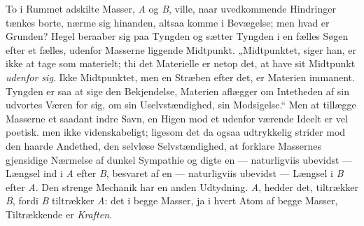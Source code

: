 \documentclass[12pt,a4paper]{book}
\begin{document}
To i Rummet adskilte Masser, \textit{A} og \textit{B}, ville, naar
uvedkommende Hindringer tænkes borte, nærme sig hinanden, altsaa komme
i Bevægelse; men hvad er Grunden? Hegel beraaber sig paa Tyngden og
sætter Tyngden i en fælles Søgen efter et fælles, udenfor Masserne
liggende Midtpunkt. „Midtpunktet, siger han, er ikke at tage som
materielt; thi det Materielle er netop det, at have sit Midtpunkt
\emph{udenfor sig}. Ikke Midtpunktet, men en Stræben efter det, er
Materien immanent. Tyngden er saa at sige den Bekjendelse, Materien
aflægger om Intetheden af sin udvortes Væren for sig, om sin
Uselvstændighed, sin Modsigelse.“ Men at tillægge Masserne et saadant
indre Savn, en Higen mod et udenfor værende Ideelt er vel poetisk. men
ikke videnskabeligt; ligesom det da ogsaa udtrykkelig strider mod den
haarde Andethed, den selvløse Selvstændighed, at forklare Massernes
gjensidige Nærmelse af dunkel Sympathie og digte en --- naturligviis
ubevidst --- Længsel ind i \textit{A} efter \textit{B}, besvaret af en
--- naturligviis ubevidst --- Længsel i \textit{B} efter \textit{A}.
Den strenge Mechanik har en anden Udtydning. \textit{A}, hedder det,
tiltrækker \textit{B}, fordi \textit{B} tiltrækker \textit{A}: det i
begge Masser, ja i hvert Atom af begge Masser, Tiltrækkende er
\emph{Kraften}.
\end{document}
